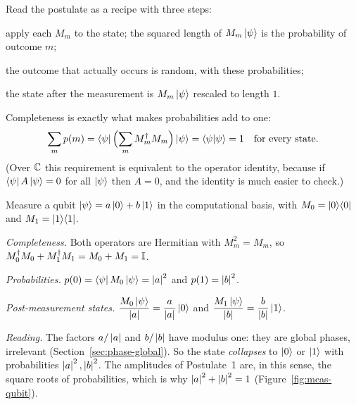Read the postulate as a recipe with three steps:
\begin{steps}
  \item apply each $M_m$ to the state; the squared length of $M_m\left|\psi\right\rangle$ is the probability of outcome $m$;
  \item the outcome that actually occurs is random, with these probabilities;
  \item the state after the measurement is $M_m\left|\psi\right\rangle$ rescaled to length $1$.
\end{steps}
Completeness is exactly what makes probabilities add to one:
\[
  \sum_mp(m)=\left\langle\psi\right|\Bigl(\sum_mM_m^\dagger M_m\Bigr)\left|\psi\right\rangle=\left\langle\psi\middle|\psi\right\rangle=1\quad\text{for every state.}
\]
(Over $\mathbb{C}$ this requirement is equivalent to the operator identity, because if $\left\langle\psi\right| A\left|\psi\right\rangle=0$ for all $\left|\psi\right\rangle$ then $A=0$, and the identity is much easier to check.)

\begin{example}\label{ex:meas-comp}
  Measure a qubit $\left|\psi\right\rangle=a\left|0\right\rangle+b\left|1\right\rangle$ in the computational basis, with $M_0=\left|0\right\rangle\!\left\langle0\right|$ and $M_1=\left|1\right\rangle\!\left\langle1\right|$.
\end{example}
\begin{solution}
  \begin{steps}
    \item \emph{Completeness.} Both operators are Hermitian with $M_m^2=M_m$, so $M_0^\dagger M_0+M_1^\dagger M_1=M_0+M_1=\mathbb{I}$.
    \item \emph{Probabilities.} $p(0)=\left\langle\psi\right| M_0\left|\psi\right\rangle=\left|a\right|^2$ and $p(1)=\left|b\right|^2$.
    \item \emph{Post-measurement states.} $\dfrac{M_0\left|\psi\right\rangle}{\left|a\right|}=\dfrac a{\left|a\right|}\left|0\right\rangle$ and $\dfrac{M_1\left|\psi\right\rangle}{\left|b\right|}=\dfrac b{\left|b\right|}\left|1\right\rangle$.
    \item \emph{Reading.} The factors $a/\left|a\right|$ and $b/\left|b\right|$ have modulus one: they are global phases, irrelevant (Section~\ref{sec:phase-global}). So the state \emph{collapses} to $\left|0\right\rangle$ or $\left|1\right\rangle$ with probabilities $\left|a\right|^2,\left|b\right|^2$. The amplitudes of Postulate~1 are, in this sense, the square roots of probabilities, which is why $\left|a\right|^2+\left|b\right|^2=1$ (Figure~\ref{fig:meas-qubit}).
  \end{steps}
\end{solution}

